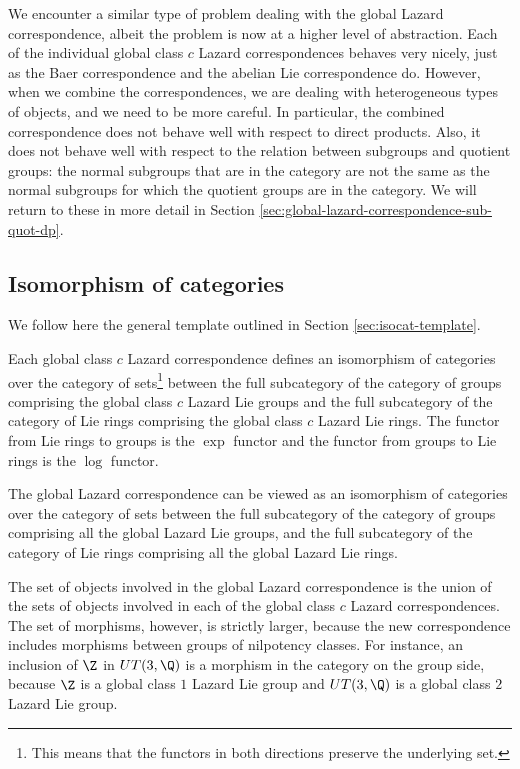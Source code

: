 \documentclass{ucetd}
\begin{document}
We encounter a similar type of problem dealing with the global Lazard
correspondence, albeit the problem is now at a higher level of
abstraction. Each of the individual global class $c$ Lazard
correspondences behaves very nicely, just as the Baer correspondence
and the abelian Lie correspondence do. However, when we combine the
correspondences, we are dealing with heterogeneous types of objects,
and we need to be more careful. In particular, the combined
correspondence does not behave well with respect to direct
products. Also, it does not behave well with respect to the relation
between subgroups and quotient groups: the normal subgroups that are
in the category are not the same as the normal subgroups for which the
quotient groups are in the category. We will return to these in more
detail in Section \ref{sec:global-lazard-correspondence-sub-quot-dp}.

\subsection{Isomorphism of categories}

We follow here the general template outlined in Section
\ref{sec:isocat-template}.

Each global class $c$ Lazard correspondence defines an isomorphism of
categories over the category of sets\footnote{This means that the
  functors in both directions preserve the underlying set.} between the
full subcategory of the category of groups comprising the global
class $c$ Lazard Lie groups and the full subcategory of the category
of Lie rings comprising the global class $c$ Lazard Lie rings. The
functor from Lie rings to groups is the $\exp$ functor and the
functor from groups to Lie rings is the $\log$ functor.

The global Lazard correspondence can be viewed as an isomorphism of
categories over the category of sets between the full subcategory of
the category of groups comprising all the global Lazard Lie groups,
and the full subcategory of the category of Lie rings comprising all
the global Lazard Lie rings.

The set of objects involved in the global Lazard correspondence is the
union of the sets of objects involved in each of the global class $c$
Lazard correspondences. The set of morphisms, however, is strictly
larger, because the new correspondence includes morphisms between
groups of nilpotency classes. For instance, an inclusion of $\Z$ in
$UT(3,\Q)$ is a morphism in the category on the group side, because
$\Z$ is a global class $1$ Lazard Lie group and $UT(3,\Q)$ is a global
class $2$ Lazard Lie group.
\end{document}
